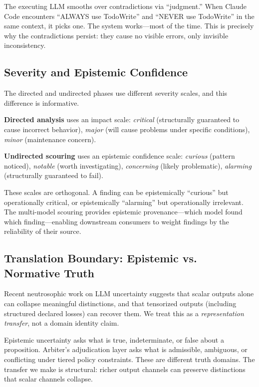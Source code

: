 \documentclass[11pt,a4paper]{article}
\begin{document}
The executing LLM smooths over contradictions via ``judgment.'' When
Claude Code encounters ``ALWAYS use TodoWrite'' and ``NEVER use
TodoWrite'' in the same context, it picks one. The system
works---most of the time. This is precisely why the contradictions
persist: they cause no visible errors, only invisible inconsistency.

\subsection{Severity and Epistemic Confidence}

The directed and undirected phases use different severity scales, and
this difference is informative.

\textbf{Directed analysis} uses an impact scale: \emph{critical}
(structurally guaranteed to cause incorrect behavior), \emph{major}
(will cause problems under specific conditions), \emph{minor}
(maintenance concern).

\textbf{Undirected scouring} uses an epistemic confidence scale:
\emph{curious} (pattern noticed), \emph{notable} (worth
investigating), \emph{concerning} (likely problematic), \emph{alarming}
(structurally guaranteed to fail).

These scales are orthogonal. A finding can be epistemically ``curious''
but operationally critical, or epistemically ``alarming'' but
operationally irrelevant. The multi-model scouring provides epistemic
provenance---which model found which finding---enabling downstream
consumers to weight findings by the reliability of their source.

\subsection{Translation Boundary: Epistemic vs. Normative Truth}
\label{sec:translation-boundary}

Recent neutrosophic work on LLM uncertainty suggests that scalar outputs
alone can collapse meaningful distinctions, and that tensorized outputs
(including structured declared losses) can recover them. We treat this
as a \emph{representation transfer}, not a domain identity claim.

Epistemic uncertainty asks what is true, indeterminate, or false about a
proposition. Arbiter's adjudication layer asks what is admissible,
ambiguous, or conflicting under tiered policy constraints. These are
different truth domains. The transfer we make is structural: richer
output channels can preserve distinctions that scalar channels collapse.
\end{document}
